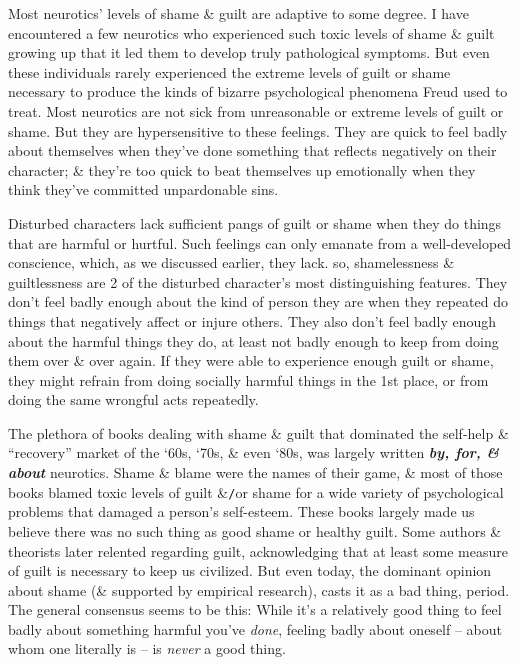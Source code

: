 \documentclass{article}
\numberwithin{equation}{section}
\begin{document}
Most neurotics' levels of shame \& guilt are adaptive to some degree. I have encountered a few neurotics who experienced such toxic levels of shame \& guilt growing up that it led them to develop truly pathological symptoms. But even these individuals rarely experienced the extreme levels of guilt or shame necessary to produce the kinds of bizarre psychological phenomena Freud used to treat. Most neurotics are not sick from unreasonable or extreme levels of guilt or shame. But they are hypersensitive to these feelings. They are quick to feel badly about themselves when they've done something that reflects negatively on their character; \& they're too quick to beat themselves up emotionally when they think they've committed unpardonable sins.

Disturbed characters lack sufficient pangs of guilt or shame when they do things that are harmful or hurtful. Such feelings can only emanate from a well-developed conscience, which, as we discussed earlier, they lack. so, shamelessness \& guiltlessness are 2 of the disturbed character's most distinguishing features. They don't feel badly enough about the kind of person they are when they repeated do things that negatively affect or injure others. They also don't feel badly enough about the harmful things they do, at least not badly enough to keep from doing them over \& over again. If they were able to experience enough guilt or shame, they might refrain from doing socially harmful things in the 1st place, or from doing the same wrongful acts repeatedly.

The plethora of books dealing with shame \& guilt that dominated the self-help \& ``recovery'' market of the `60s, `70s, \& even `80s, was largely written \textbf{\textit{by, for, \& about}} neurotics. Shame \& blame were the names of their game, \& most of those books blamed toxic levels of guilt \&\texttt{/}or shame for a wide variety of psychological problems that damaged a person's self-esteem. These books largely made us believe there was no such thing as good shame or healthy guilt. Some authors \& theorists later relented regarding guilt, acknowledging that at least some measure of guilt is necessary to keep us civilized. But even today, the dominant opinion about shame (\& supported by empirical research), casts it as a bad thing, period. The general consensus seems to be this: While it's a relatively good thing to feel badly about something harmful you've \textit{done}, feeling badly about oneself -- about whom one literally is -- is \textit{never} a good thing.
\end{document}
